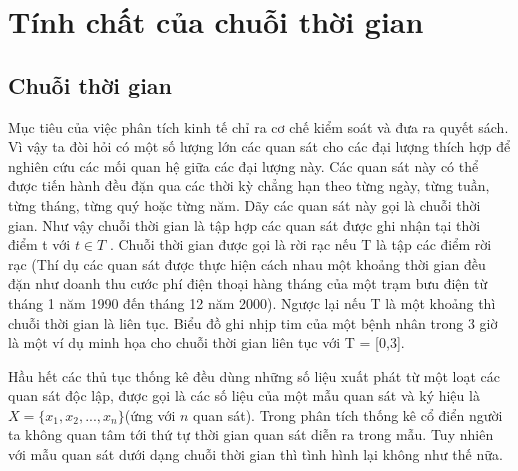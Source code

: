 \documentclass[twoside,12pt]{Latex/Classes/PhDthesisPSnPDF}
\begin{document}
\renewcommand\baselinestretch{1.2}
\renewcommand*\listfigurename{Danh sách hình vẽ}
\renewcommand*\listtablename{Danh sách bảng}
\renewcommand*\figurename{Hình}
\renewcommand*\contentsname{Mục lục}
\renewcommand*\tablename{Bảng}


\mainmatter

\renewcommand{\chaptername}{}



\graphicspath{{figures/}}

\chapter{Tính chất của chuỗi thời gian}
\section{Chuỗi thời gian}
Mục tiêu của việc phân tích kinh tế chỉ ra cơ chế kiểm soát và đưa ra quyết sách. Vì vậy ta đòi hỏi có một số lượng lớn các quan sát cho các đại lượng thích hợp để nghiên cứu các mối quan hệ giữa các đại lượng này. Các quan sát này có thể được tiến hành đều đặn qua các thời kỳ chẳng hạn theo từng ngày, từng tuần, từng tháng, từng quý hoặc từng năm. Dãy các quan sát này gọi là chuỗi thời gian. Như vậy chuỗi thời gian là tập hợp các quan sát được ghi nhận tại thời điểm t với $t \in T$ . Chuỗi thời gian được gọi là rời rạc nếu T là tập các điểm rời rạc (Thí dụ các quan sát được thực hiện cách nhau một khoảng thời gian đều đặn như doanh thu cước phí điện thoại hàng tháng của một trạm bưu điện từ tháng 1 năm 1990 đến tháng 12 năm 2000). Ngược lại nếu T là một khoảng thì chuỗi thời gian là liên tục. Biểu đồ ghi nhịp tim của một bệnh nhân trong 3 giờ là một ví dụ minh họa cho chuỗi thời gian liên tục với T =  [0,3].

Hầu hết các thủ tục thống kê đều dùng những số liệu xuất phát từ một loạt các quan sát độc lập, được gọi là các số liệu của một mẫu quan sát và ký hiệu là $X =\{x_1,x_2,...,x_n\}$(ứng với $n$ quan sát). Trong phân tích thống kê cổ điển người ta không quan tâm tới thứ tự thời gian quan sát diễn ra trong mẫu. Tuy nhiên với mẫu quan sát dưới dạng chuỗi thời gian thì tình hình lại không như thế nữa.
\end{document}
